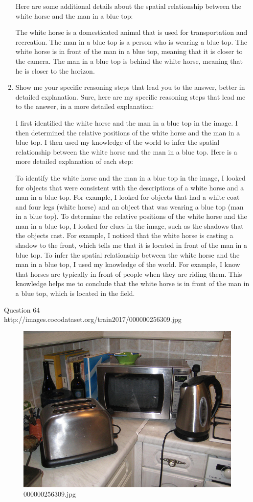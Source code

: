 \begin{enumerate}
    Here are some additional details about the spatial relationship between the white horse and the man in a blue top:
    
    The white horse is a domesticated animal that is used for transportation and recreation.
    The man in a blue top is a person who is wearing a blue top.
    The white horse is in front of the man in a blue top, meaning that it is closer to the camera.
    The man in a blue top is behind the white horse, meaning that he is closer to the horizon.
    \item Show me your specific reasoning steps that lead you to the answer, better in detailed explanation.
    \subitem 
    Sure, here are my specific reasoning steps that lead me to the answer, in a more detailed explanation:
    
    I first identified the white horse and the man in a blue top in the image.
    I then determined the relative positions of the white horse and the man in a blue top.
    I then used my knowledge of the world to infer the spatial relationship between the white horse and the man in a blue top.
    Here is a more detailed explanation of each step:
    
    To identify the white horse and the man in a blue top in the image, I looked for objects that were consistent with the descriptions of a white horse and a man in a blue top. For example, I looked for objects that had a white coat and four legs (white horse) and an object that was wearing a blue top (man in a blue top).
    To determine the relative positions of the white horse and the man in a blue top, I looked for clues in the image, such as the shadows that the objects cast. For example, I noticed that the white horse is casting a shadow to the front, which tells me that it is located in front of the man in a blue top.
    To infer the spatial relationship between the white horse and the man in a blue top, I used my knowledge of the world. For example, I know that horses are typically in front of people when they are riding them. This knowledge helps me to conclude that the white horse is in front of the man in a blue top, which is located in the field.
\end{enumerate}
Question 64\\
http://images.cocodataset.org/train2017/000000256309.jpg
\begin{figure}[h]
    \centering
    \includegraphics[width=0.8\linewidth]{../image set/hard/000000256309.jpg}
    \caption{000000256309.jpg}
\end{figure}
